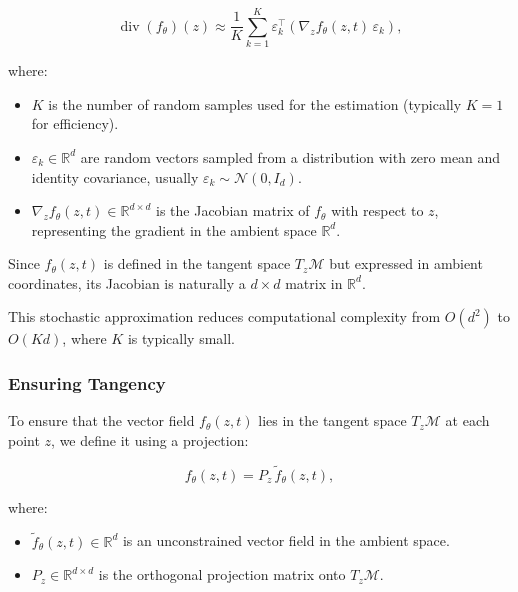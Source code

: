 \documentclass[a4paper,14pt]{article}
\renewcommand{\epsilon}{\ensuremath{\varepsilon}}
\theoremstyle{plain} %
\theoremstyle{definition} %
\theoremstyle{remark} %
\begin{document}
	\begin{equation}
		\operatorname{div}(f_\theta)(z) \approx \frac{1}{K} \sum_{k=1}^K \epsilon_k^\top \left( \nabla_z f_\theta(z, t) \, \epsilon_k \right),
	\end{equation}
	
	where:
	
	\begin{itemize}
		\item \(K\) is the number of random samples used for the estimation (typically \(K=1\) for efficiency).
		\item \(\epsilon_k \in \mathbb{R}^d\) are random vectors sampled from a distribution with zero mean and identity covariance, usually \(\epsilon_k \sim \mathcal{N}(0, I_d)\).
		\item \(\nabla_z f_\theta(z, t) \in \mathbb{R}^{d \times d}\) is the Jacobian matrix of \(f_\theta\) with respect to \(z\), representing the gradient in the ambient space \(\mathbb{R}^d\).
	\end{itemize}
	
	Since \(f_\theta(z, t)\) is defined in the tangent space \(T_z\mathcal{M}\) but expressed in ambient coordinates, its Jacobian is naturally a \(d \times d\) matrix in \(\mathbb{R}^d\).
	
	This stochastic approximation reduces computational complexity from \(O(d^2)\) to \(O(Kd)\), where \(K\) is typically small.
	
	\subsubsection{Ensuring Tangency}
	
	To ensure that the vector field \(f_\theta(z, t)\) lies in the tangent space \(T_z \mathcal{M}\) at each point \(z\), we define it using a projection:
	
	\begin{equation}
		f_\theta(z, t) = P_z \, \tilde{f}_\theta(z, t),
	\end{equation}
	
	where:
	
	\begin{itemize}
		\item \(\tilde{f}_\theta(z, t) \in \mathbb{R}^d\) is an unconstrained vector field in the ambient space.
		\item \(P_z \in \mathbb{R}^{d \times d}\) is the orthogonal projection matrix onto \(T_z \mathcal{M}\).
	\end{itemize}
	
\end{document}
